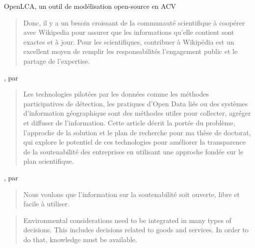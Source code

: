 OpenLCA, un outil de modélisation open-source en ACV ~\cite{ciroth_ict_2007}


\blockcquote[traduction]{logan_ten_2010}{
Donc, il y a un besoin croissant de la communauté scientifique à coopérer avec Wikipedia pour assurer que les informations qu'elle contient sont exactes et à jour.
Pour les scientifiques, contribuer à Wikipédia est un excellent moyen de remplir les responsabilités l'engagement public et le partage de l'expertise.
}

, par \citeauthor{madlberger_development_2013}
\blockcquote{madlberger_development_2013}{
Les technologies pilotées par les données comme les méthodes participatives de détection, les pratiques d'Open Data liés ou des systèmes d'information géographique sont des méthodes utiles pour collecter, agréger et diffuser de l'information.
Cette article décrit la portée du problème, l'approche de la solution et le plan de recherche pour ma thèse de doctorat, qui explore le potentiel de ces technologies pour améliorer la transparence de la soutenabilité des entreprises en utilisant une approche fondée sur le plan scientifique.
}


, par \citeauthor{bonanni_open_2010}
\blockcquote[traduction]{bonanni_open_2010}{
Nous voulons que l'information sur la soutenabilité soit ouverte, libre et facile à utiliser.
}
\cite{finnveden_recent_2009}
\blockcquote{finnveden_recent_2009}{
Environmental considerations need to be integrated in many
types of decisions. This includes decisions related to goods and
services. In order to do that, knowledge must be available.
}